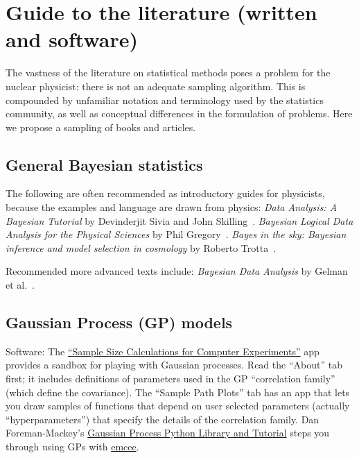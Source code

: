 \section{Guide to the literature (written and software)}  \label{sec:literature}

\bi
  \I The vastness of the literature on statistical methods poses a problem for the
      nuclear physicist: there is not an adequate sampling algorithm.  This is compounded
      by unfamiliar notation and terminology used by the statistics community, as well
      as conceptual differences in the formulation of problems.
  \I Here we propose a sampling of books and articles.
\ei


\subsection{General Bayesian statistics} \label{subsec:gen_bayesian_lit}

The following are often recommended as introductory guides for
physicists, because the examples and language are drawn from physics:
\bi
  \I \textit{Data Analysis: A Bayesian Tutorial} by Devinderjit Sivia and John Skilling~\cite{Sivia:2006}.
  \I \textit{Bayesian Logical Data Analysis for the Physical Sciences} by Phil Gregory~\cite{Gregory:2005}.
  \I \textit{Bayes in the sky: Bayesian inference and model selection in cosmology}
   by Roberto Trotta~\cite{Trotta:2008qt}.
\ei

Recommended more advanced texts include:
\bi
  \I \textit{Bayesian Data Analysis} by Gelman et al.~\cite{Gelman03}.
\ei


\subsection{Gaussian Process (GP) models} \label{subsec:GP_lit}

Software:
\bi
 \I
     The \href{https://harario.shinyapps.io/Sample_Size_Shiny/}{``Sample Size Calculations for Computer Experiments''} app provides a sandbox for playing with
     Gaussian processes.  Read the ``About'' tab first; it includes definitions
     of parameters used in the GP ``correlation family'' (which define the covariance).
     The ``Sample Path Plots'' tab has an app that lets you draw samples of functions
     that depend on user selected parameters (actually ``hyperparameters'') that specify 
     the details of the correlation family.  
 \I Dan Foreman-Mackey's \href{http://dan.iel.fm/george/current/user/model/}{Gaussian Process Python Library and Tutorial} steps you through using GPs with \href{http://dan.iel.fm/emcee/}{emcee}.
\ei 

